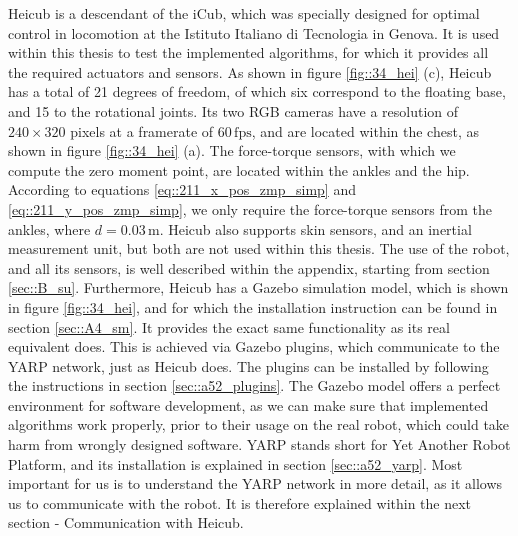 \label{sec::34_he}
Heicub is a descendant of the iCub, which was specially designed for optimal control in locomotion at the Istituto Italiano di Tecnologia in Genova. It is used within this thesis to test the implemented algorithms, for which it provides all the required actuators and sensors. As shown in figure \ref{fig::34_hei} (c), Heicub has a total of 21 degrees of freedom, of which six correspond to the floating base, and 15 to the rotational joints. Its two RGB cameras have a resolution of $240\times320$ pixels at a framerate of $60\,\text{fps}$, and are located within the chest, as shown in figure \ref{fig::34_hei} (a). The force-torque sensors, with which we compute the zero moment point, are located within the ankles and the hip. According to equations \ref{eq::211_x_pos_zmp_simp} and \ref{eq::211_y_pos_zmp_simp}, we only require the force-torque sensors from the ankles, where $d=0.03\,\text{m}$. Heicub also supports skin sensors, and an inertial measurement unit, but both are not used within this thesis. The use of the robot, and all its sensors, is well described within the appendix, starting from section \ref{sec::B_su}. Furthermore, Heicub has a Gazebo simulation model, which is shown in figure \ref{fig::34_hei}, and for which the installation instruction can be found in section \ref{sec::A4_sm}. It provides the exact same functionality as its real equivalent does. This is achieved via Gazebo plugins, which communicate to the YARP network, just as Heicub does. The plugins can be installed by following the instructions in section \ref{sec::a52_plugins}. The Gazebo model offers a perfect environment for software development, as we can make sure that implemented algorithms work properly, prior to their usage on the real robot, which could take harm from wrongly designed software. YARP stands short for Yet Another Robot Platform, and its installation is explained in section \ref{sec::a52_yarp}. Most important for us is to understand the YARP network in more detail, as it allows us to communicate with the robot. It is therefore explained within the next section - Communication with Heicub.
